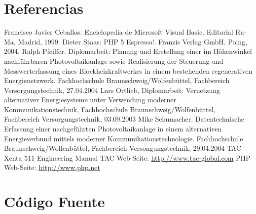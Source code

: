 \documentclass[twocolumn,a4paper,10pt]{article}
\begin{document}
\section*{Referencias}
\begin{thebibliography}{99}
     Francisco Javier Ceballos: Enciclopedia de Microsoft Visual
        Basic. Editorial Ra-Ma. Madrid, 1999.
     Dieter Staas: PHP 5 Espresso!. Franzis Verlag GmbH.
        Poing, 2004.
     Ralph Pfeiffer. Diplomarbeit: Planung und
        Erstellung einer im Höhenwinkel nachführbaren Photovoltaikanlage
        sowie Realisierung der Steuerung und Messwerterfassung eines
        Blockheizkraftwerkes in einem bestehenden regenerativen
        Energienetzwerk. Fachhochschule Braunschweig/Wolfenbüttel,
        Fachbereich Versorgungstechnik, 27.04.2004
    Lars Ortlieb, Diplomarbeit: Vernetzung alternativer
        Energiesysteme unter Verwendung moderner Kommunikationstechnik,
        Fachhochschule Braunschweig/Wolfenbüttel, Fachbereich
        Versorgungstechnik, 03.09.2003
     Mike Schumacher. Datentechnische Erfassung einer
        nachgeführten Photovoltaikanlage in einem alternativen
        Energieverbund mittels moderner Kommunikationstechnologie.
        Fachhochschule Braunschweig/Wolfenbüttel, Fachbereich
        Versongungstechnik, 29.04.2004
     TAC Xenta 511 Engineering Manual
     TAC Web-Seite: \url{http://www.tac-global.com}
     PHP Web-Seite: \url{http://www.php.net}
\end{thebibliography}

\section*{Código Fuente}
    
    
\end{document}
